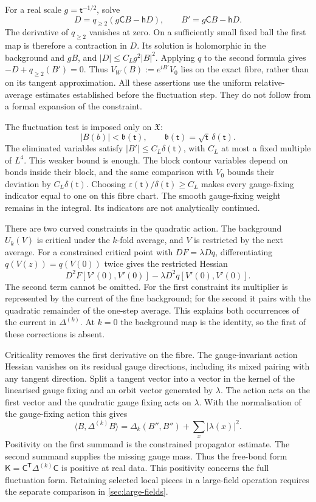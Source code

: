 \documentclass[11pt,letterpaper,reqno]{amsart}
\theoremstyle{definition}
\theoremstyle{remark}
\begin{document}
For a real scale $g=\mathsf t^{-1/2}$, solve
\begin{equation}\label{eq:deep-pivot-fixed-point}
 D=q_{\ge2}(g\mathsf CB-\mathsf hD),\qquad
 B'=g\mathsf CB-\mathsf hD.
\end{equation}
The derivative of $q_{\ge2}$ vanishes at zero. On a sufficiently
small fixed ball the first map is therefore a contraction in $D$.
Its solution is holomorphic in the background and $gB$, and
$|D|\le C_Lg^2|B|^2$. Applying $q$ to the second formula gives
$-D+q_{\ge2}(B')=0$. Thus
$V_W(B):=e^{iB'}V_0$ lies on the exact fibre, rather than on its
tangent approximation. All these assertions use the uniform
relative-average estimates established before the fluctuation
step. They do not follow from a formal expansion of the constraint.

The fluctuation test is imposed only on $\mathfrak X$:
\[
 |B(b)|<\mathfrak b(\mathsf t),\qquad
 \mathfrak b(\mathsf t)=\sqrt{\mathsf t}\,\delta(\mathsf t).
\]
The eliminated variables satisfy $|B'|\le C_L\delta(\mathsf t)$,
with $C_L$ at most a fixed multiple of $L^4$. This weaker bound
is enough. The block contour variables depend on bonds inside
their block, and the same comparison with $V_0$ bounds their
deviation by $C_L\delta(\mathsf t)$. Choosing
$\varepsilon(\mathsf t)/\delta(\mathsf t)\ge C_L$ makes every
gauge-fixing indicator equal to one on this fibre chart. The
smooth gauge-fixing weight remains in the integral. Its indicators
are not analytically continued.

There are two curved constraints in the quadratic action. The
background $U_k(V)$ is critical under the $k$-fold average, and
$V$ is restricted by the next average. For a constrained critical
point with $DF=\lambda Dq$, differentiating $q(V(z))=q(V(0))$
twice gives the restricted Hessian
\[
 D^2F[V'(0),V'(0)]-\lambda D^2q[V'(0),V'(0)].
\]
The second term cannot be omitted. For the first constraint its
multiplier is represented by the current of the fine background;
for the second it pairs with the quadratic remainder of the
one-step average. This explains both occurrences of the current
in $\Delta^{(k)}$. At $k=0$ the background map is the identity,
so the first of these corrections is absent.

Criticality removes the first derivative on the fibre. The
gauge-invariant action Hessian vanishes on its residual gauge
directions, including its mixed pairing with any tangent direction.
Split a tangent vector into a vector in the kernel of the
linearised gauge fixing and an orbit vector generated by
$\lambda$. The action acts on the first vector and the quadratic
gauge fixing acts on $\lambda$. With the normalisation of the
gauge-fixing action this gives
\[
 \langle B,\Delta^{(k)}B\rangle
     =\Delta_k(B'',B'')+\sum_x|\lambda(x)|^2.
\]
Positivity on the first summand is the constrained propagator
estimate. The second summand supplies the missing gauge mass.
Thus the free-bond form
$\mathsf K=\mathsf C^{\mathsf T}\Delta^{(k)}\mathsf C$ is
positive at real data. This positivity concerns the full
fluctuation form. Retaining selected local pieces in a large-field
operation requires the separate comparison in
\cref{sec:large-fields}.
\end{document}
